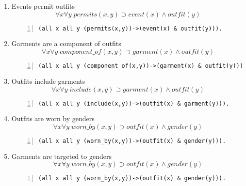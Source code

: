 \documentclass[paper=a4, fontsize=11pt]{scrartcl} %
\numberwithin{equation}{section} %
\numberwithin{figure}{section} %
\numberwithin{table}{section} %
\begin{document}
\begin{enumerate}

\item Events permit outfits
\begin{equation*}
	\forall x \forall y \; permits(x,y) \supset event(x) \land outfit(y) 
\end{equation*}
\begin{Verbatim}[gobble=2, numbers=left]
	(all x all y (permits(x,y))->(event(x) & outfit(y))).
\end{Verbatim}
	

\item Garments are a component of outfits
\begin{equation*}
	\forall x \forall y \; component\_of(x,y) \supset garment(x) \land outfit(y)
\end{equation*}
\begin{Verbatim}[gobble=2, numbers=left]
	(all x all y (component_of(x,y))->(garment(x) & outfit(y))).
\end{Verbatim}
	

\item Outfits include garments
\begin{equation*}
	\forall x \forall y \; include(x,y) \supset garment(x) \land outfit(y)
\end{equation*}
\begin{Verbatim}[gobble=2, numbers=left]
	(all x all y (include(x,y))->(outfit(x) & garment(y))).
\end{Verbatim}


\item Outfits are worn by genders
\begin{equation*}
	\forall x \forall y \; worn\_by(x,y) \supset outfit(x) \land gender(y)
\end{equation*}
\begin{Verbatim}[gobble=2, numbers=left]
	(all x all y (worn_by(x,y))->(outfit(x) & gender(y))).
\end{Verbatim}


\item Garments are targeted to genders
\begin{equation*}
	\forall x \forall y \; worn\_by(x,y) \supset outfit(x) \land gender(y)
\end{equation*}
\begin{Verbatim}[gobble=2, numbers=left]
	(all x all y (worn_by(x,y))->(outfit(x) & gender(y))).
\end{Verbatim}


\end{enumerate}
\end{document}
